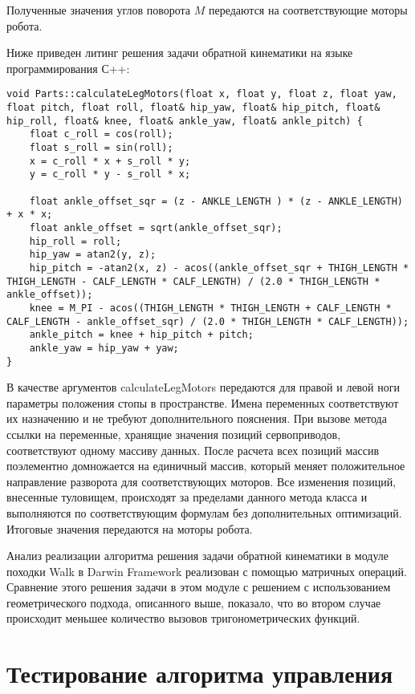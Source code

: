 Полученные значения углов поворота $M$ передаются на соответствующие моторы робота.

Ниже приведен литинг решения задачи обратной кинематики на языке программирования С++:

\lstset{language=C++}
\begin{lstlisting}
void Parts::calculateLegMotors(float x, float y, float z, float yaw, float pitch, float roll, float& hip_yaw, float& hip_pitch, float& hip_roll, float& knee, float& ankle_yaw, float& ankle_pitch) {    
    float c_roll = cos(roll);
    float s_roll = sin(roll);
    x = c_roll * x + s_roll * y;
    y = c_roll * y - s_roll * x;

    float ankle_offset_sqr = (z - ANKLE_LENGTH ) * (z - ANKLE_LENGTH) + x * x;
    float ankle_offset = sqrt(ankle_offset_sqr);
    hip_roll = roll;
    hip_yaw = atan2(y, z);
    hip_pitch = -atan2(x, z) - acos((ankle_offset_sqr + THIGH_LENGTH * THIGH_LENGTH - CALF_LENGTH * CALF_LENGTH) / (2.0 * THIGH_LENGTH * ankle_offset));
    knee = M_PI - acos((THIGH_LENGTH * THIGH_LENGTH + CALF_LENGTH * CALF_LENGTH - ankle_offset_sqr) / (2.0 * THIGH_LENGTH * CALF_LENGTH));
    ankle_pitch = knee + hip_pitch + pitch;
    ankle_yaw = hip_yaw + yaw;
}
\end{lstlisting}

В качестве аргументов calculateLegMotors передаются для правой и левой ноги параметры положения стопы в пространстве. Имена переменных соответствуют их назначению и не требуют дополнительного пояснения. При вызове метода ссылки на переменные, хранящие значения позиций сервоприводов, соответствуют одному массиву данных. После расчета всех позиций массив поэлементно домножается на единичный массив, который меняет положительное направление разворота для соответствующих моторов. Все изменения позиций, внесенные туловищем, происходят за пределами данного метода класса и выполняются по соответствующим формулам без дополнительных оптимизаций. Итоговые значения передаются на моторы робота.

Анализ реализации алгоритма решения задачи обратной кинематики в модуле походки Walk в Darwin Framework реализован с помощью матричных операций. Сравнение этого решения задачи в этом модуле с решением с использованием геометрического подхода, описанного выше, показало, что во втором случае происходит меньшее количество вызовов тригонометрических функций.

\section{Тестирование алгоритма управления}

